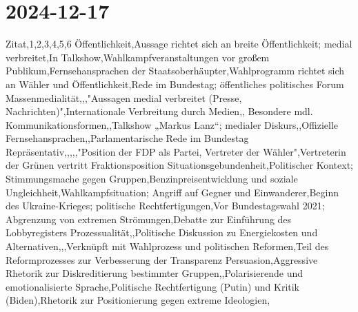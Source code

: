 \section{2024-12-17}
\page

\startframedtext[width=\dimexpr\textwidth+\rightmarginwidth+\rightmargindistance\relax,frame=off,offset=none] %
\startplacetable[location={here},title={}]
\setupTABLE[c][1][background=color,backgroundcolor=gray]
\setupTABLE[r][1][background=color,backgroundcolor=gray,style=bold]
\bTABLE[offset=1mm,option=stretch]
\startCSV
Zitat,1,2,3,4,5,6
Öffentlichkeit,Aussage richtet sich an breite Öffentlichkeit; medial verbreitet,In Talkshow,Wahlkampfveranstaltungen vor großem Publikum,Fernsehansprachen der Staatsoberhäupter,Wahlprogramm richtet sich an Wähler und Öffentlichkeit,Rede im Bundestag; öffentliches politisches Forum
Massenmedialität,,,"Aussagen medial verbreitet (Presse, Nachrichten)",Internationale Verbreitung durch Medien,,
Besondere mdl. Kommunikationsformen,,Talkshow „Markus Lanz“; medialer Diskurs,,Offizielle Fernsehansprachen,,Parlamentarische Rede im Bundestag
Repräsentativ,,,,,"Position der FDP als Partei, Vertreter der Wähler",Vertreterin der Grünen vertritt Fraktionsposition
Situationsgebundenheit,Politischer Kontext; Stimmungsmache gegen Gruppen,Benzinpreisentwicklung und soziale Ungleichheit,Wahlkampfsituation; Angriff auf Gegner und Einwanderer,Beginn des Ukraine-Krieges; politische Rechtfertigungen,Vor Bundestagswahl 2021; Abgrenzung von extremen Strömungen,Debatte zur Einführung des Lobbyregisters
Prozessualität,,Politische Diskussion zu Energiekosten und Alternativen,,,Verknüpft mit Wahlprozess und politischen Reformen,Teil des Reformprozesses zur Verbesserung der Transparenz
Persuasion,Aggressive Rhetorik zur Diskreditierung bestimmter Gruppen,,Polarisierende und emotionalisierte Sprache,Politische Rechtfertigung (Putin) und Kritik (Biden),Rhetorik zur Positionierung gegen extreme Ideologien,
\stopCSV
\eTABLE
\stopplacetable
\stopframedtext
